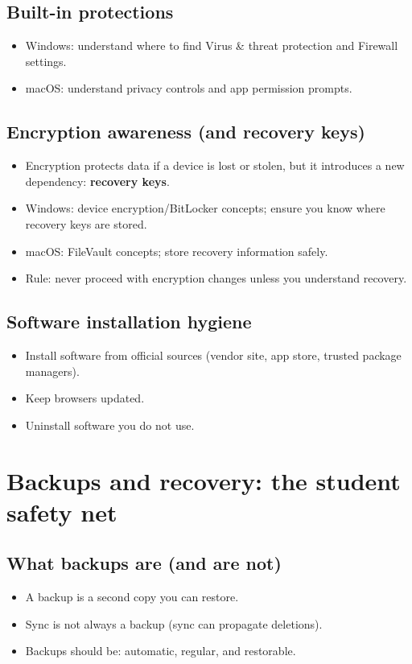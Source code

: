 \subsection{Built-in protections}
\begin{itemize}
\item Windows: understand where to find Virus \& threat protection and Firewall settings.
\item macOS: understand privacy controls and app permission prompts.
\end{itemize}

\subsection{Encryption awareness (and recovery keys)}
\begin{itemize}
\item Encryption protects data if a device is lost or stolen, but it introduces a new dependency: \textbf{recovery keys}.
\item Windows: device encryption/BitLocker concepts; ensure you know where recovery keys are stored.
\item macOS: FileVault concepts; store recovery information safely.
\item Rule: never proceed with encryption changes unless you understand recovery.
\end{itemize}

\subsection{Software installation hygiene}
\begin{itemize}
\item Install software from official sources (vendor site, app store, trusted package managers).
\item Keep browsers updated.
\item Uninstall software you do not use.
\end{itemize}

\section{Backups and recovery: the student safety net}
\subsection{What backups are (and are not)}
\begin{itemize}
\item A backup is a second copy you can restore.
\item Sync is not always a backup (sync can propagate deletions).
\item Backups should be: automatic, regular, and restorable.
\end{itemize}

